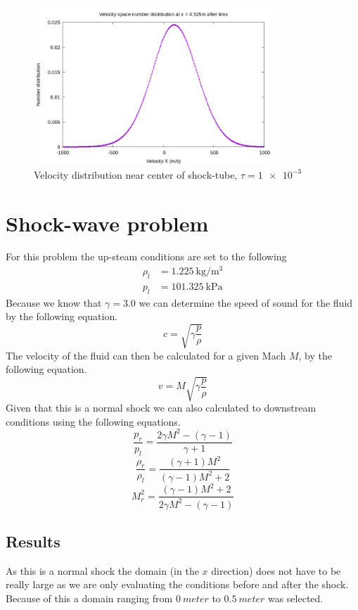 \documentclass[paper=a4, fontsize=12pt]{scrartcl}
\begin{document}
\begin{figure}[H]
        \centering
        \includegraphics[width=0.8\textwidth]{center_shock}
        \caption{Velocity distribution near center of shock-tube, $\tau = \SI{1e-3}{}$}
        \label{fig:center_shock}
\end{figure}


\section{Shock-wave problem}
For this problem the up-steam conditions are set to the following
\begin{align*}
        \rho_l &= \SI{1.225}{\kilogram \per \meter^3}\\
        p_l &= \SI{101.325}{\kilo \pascal}
\end{align*}
Because we know that $\gamma = 3.0$ we can determine the speed of sound for the fluid by the following
equation.
\[
        c= \sqrt{\gamma \frac{p}{\rho}}
\]
The velocity of the fluid can then be calculated for a given Mach $M$, by the following equation.
\[
v = M \sqrt{\gamma \frac{p}{\rho}}
\]
Given that this is a normal shock we can also calculated to downstream conditions using the following
equations.
\[
        \frac{p_r}{p_l} = \frac{2 \gamma M^2 - (\gamma-1)}{\gamma+1}
\]
\[
        \frac{\rho_r}{\rho_l} = \frac{(\gamma+1)M^2}{(\gamma-1)M^2 +2}
\]
\[
        M_r^2= \frac{(\gamma -1)M^2 +2}{2\gamma M^2-(\gamma-1)}
\]
\subsection{Results}
As this is a normal shock the domain (in the $x$ direction) does not have to be really large as we are only
evaluating the conditions before and after the shock.
Because of this a domain ranging from $\SI{0}{meter}$ to $\SI{0.5}{meter}$ was selected.
\end{document}
